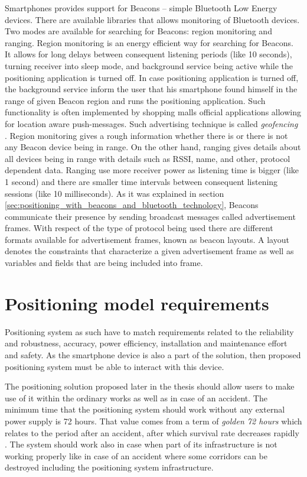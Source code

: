 \documentclass[../main.tex]{subfiles}
\begin{document}
Smartphones provides support for Beacons -- simple Bluetooth Low Energy devices. There are available libraries that allows monitoring of Bluetooth devices. Two modes are available for searching for Beacons: region monitoring and ranging. Region monitoring is an energy efficient way for searching for Beacons. It allows for long delays between consequent listening periods (like 10 seconds), turning receiver into sleep mode, and background service being active while the positioning application is turned off. In case positioning application is turned off, the background service inform the user that his smartphone found himself in the range of given Beacon region and runs the positioning application. Such functionality is often implemented by shopping malls official applications allowing for location aware push-messages. Such advertising technique is called \textit{geofencing} \cite{beacon_rssi_analysis}. Region monitoring gives a rough information whether there is or there is not any Beacon device being in range. On the other hand, ranging gives details about all devices being in range with details such as RSSI, name, and other, protocol dependent data. Ranging use more receiver power as listening time is bigger (like 1 second) and there are smaller time intervals between consequent listening sessions (like 10 milliseconds). As it was explained in section \ref{sec:positioning_with_beacons_and_bluetooth_technology}, Beacons communicate their presence by sending broadcast messages called advertisement frames. With respect of the type of protocol being used there are different formats available for advertisement frames, known as beacon layouts. A layout denotes the constraints that characterize a given advertisement frame as well as variables and fields that are being included into frame.


\section{Positioning model requirements}
Positioning system as such have to match requirements related to the reliability and robustness, accuracy, power efficiency, installation and maintenance effort and safety. As the smartphone device is also a part of the solution, then proposed positioning system must be able to interact with this device.

The positioning solution proposed later in the thesis should allow users to make use of it within the ordinary works as well as in case of an accident. The minimum time that the positioning system should work without any external power supply is 72 hours. That value comes from a term of \textit{golden 72 hours} which relates to the period after an accident, after which survival rate decreases rapidly \cite{positioning_tests}. The system should work also in case when part of its infrastructure is not working properly like in case of an accident where some corridors can be destroyed including the positioning system infrastructure.
\end{document}
